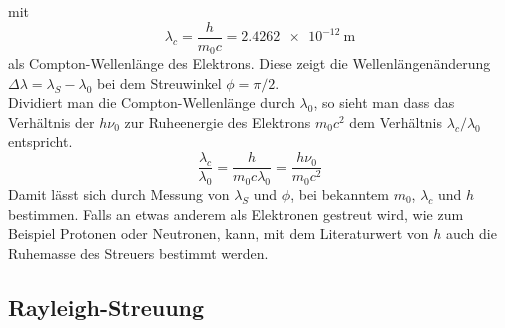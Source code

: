 \documentclass[.../bericht]{subfilies}
\begin{document}
        mit
        \begin{equation}
          \lambda_c=\frac{h}{m_0c}=\SI{2,4262e-12}{\meter}
          \label{cwellenl}
        \end{equation}
        als Compton-Wellenlänge des Elektrons. Diese zeigt die Wellenlängenänderung $\Delta \lambda =\lambda_S -\lambda_0$ bei dem Streuwinkel $\phi=\pi/2$. \\
        Dividiert man die Compton-Wellenlänge durch $\lambda_0$, so sieht man dass das Verhältnis der $h\nu_0$ zur Ruheenergie des Elektrons $m_0c^2$ dem Verhältnis $\lambda_c/\lambda_0$ entspricht.
      \begin{equation*}
      \frac{\lambda_c}{\lambda_0}=\frac{h}{m_0c\lambda_0}=\frac{h\nu_0}{m_0c^2}
    \end{equation*}
      Damit lässt sich durch Messung von $\lambda_S$ und $\phi$, bei bekanntem $m_0$, $\lambda_c$ und $h$ bestimmen. Falls an etwas anderem als Elektronen gestreut wird, wie zum Beispiel Protonen oder Neutronen, kann, mit dem Literaturwert von $h$ auch die Ruhemasse des Streuers bestimmt werden.\\
      \cite{dem:exp3}

    \subsection{Rayleigh-Streuung}
  	\label{sec:Rayleigh-Streuung}
\end{document}
